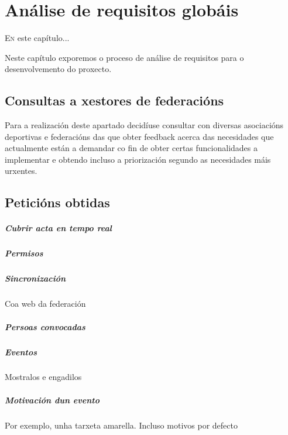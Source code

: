 \chapter{Análise de requisitos globáis}
\minitoc
\label{chap:Analisederequisitosglobais}
\vspace{0.5cm}


  \lettrine{E}{n} este capítulo...

  Neste capítulo exporemos o proceso de análise de requisitos para o desenvolvemento do 
proxecto.

  \section{Consultas a xestores de federacións}
  Para a realización deste apartado decidíuse consultar con diversas asociacións 
deportivas e federacións das que obter feedback acerca das necesidades que 
actualmente están a demandar co fin de obter certas funcionalidades a implementar e 
obtendo incluso a priorización segundo as necesidades máis urxentes.


  \section{Peticións obtidas}
  
  \paragraph{Cubrir acta en tempo real}
  \paragraph{Permisos}
  \paragraph{Sincronización} Coa web da federación
  \paragraph{Persoas convocadas}
  \paragraph{Eventos} Mostralos e engadilos
  \paragraph{Motivación dun evento} Por exemplo, unha tarxeta amarella. Incluso motivos 
por defecto
